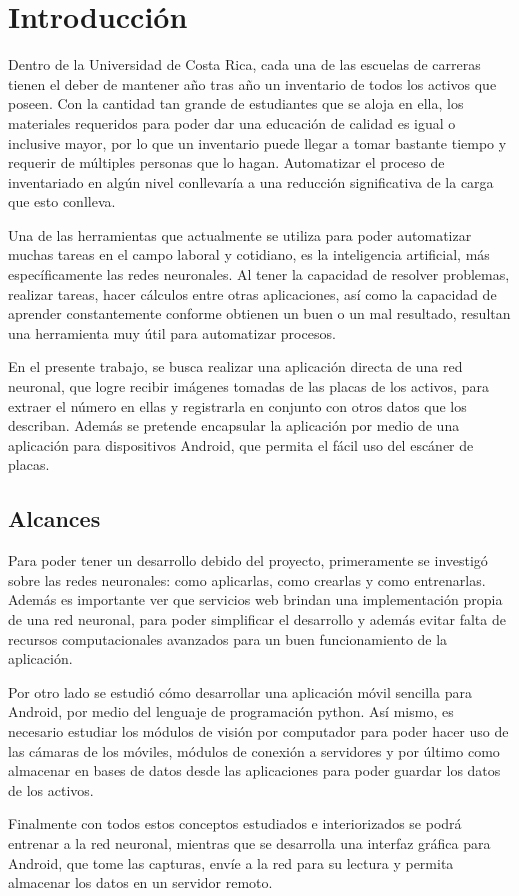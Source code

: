   \chapter{Introducción}
\label{C:introduccion}
Dentro de la Universidad de Costa Rica, cada una de las escuelas de carreras tienen el deber de mantener año tras año un inventario de todos los activos que poseen. Con la cantidad tan grande de estudiantes que se aloja en ella, los materiales requeridos para poder dar una educación de calidad es igual o inclusive mayor, por lo que un inventario puede llegar a tomar bastante tiempo y requerir de múltiples personas que lo hagan. Automatizar el proceso de inventariado en algún nivel conllevaría a una reducción significativa de la carga que esto conlleva.
\par
Una de las herramientas que actualmente se utiliza para poder automatizar muchas tareas en el campo laboral y cotidiano, es la inteligencia artificial, más específicamente las redes neuronales. Al tener la capacidad de resolver problemas, realizar tareas, hacer cálculos entre otras aplicaciones, así como la capacidad de aprender constantemente conforme obtienen un buen o un mal resultado, resultan una herramienta muy útil para automatizar procesos.
\par
En el presente trabajo, se busca realizar una aplicación directa de una red neuronal, que logre recibir imágenes tomadas de las placas de los activos, para extraer el número en ellas y registrarla en conjunto con otros datos que los describan. Además se pretende encapsular la aplicación por medio de una aplicación para dispositivos Android, que permita el fácil uso del escáner de placas.

\section{Alcances}
Para poder tener un desarrollo debido del proyecto, primeramente se investigó sobre las redes neuronales: como aplicarlas, como crearlas y como entrenarlas. Además es importante ver que servicios web brindan una implementación propia de una red neuronal, para poder simplificar el desarrollo y además evitar falta de recursos computacionales avanzados para un buen funcionamiento de la aplicación. 
\par
Por otro lado se estudió cómo desarrollar una aplicación móvil sencilla para Android, por medio del lenguaje de programación python. Así mismo, es necesario estudiar los módulos de visión por computador para poder hacer uso de las cámaras de los móviles, módulos de conexión a servidores y por último como almacenar en bases de datos desde las aplicaciones para poder guardar los datos de los activos.
\par
Finalmente con todos estos conceptos estudiados e interiorizados se podrá entrenar a la red neuronal, mientras que se desarrolla una interfaz gráfica para Android, que tome las capturas, envíe a la red para su lectura y permita almacenar los datos en un servidor remoto.


